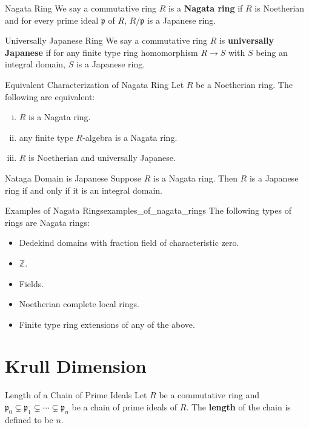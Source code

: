 \begin{definition}{Nagata Ring}{}
    We say a commutative ring $R$ is a \textbf{Nagata ring} if $R$ is Noetherian and for every prime ideal $\mathfrak{p}$ of $R$, $R/\mathfrak{p}$ is a Japanese ring.
\end{definition}

\begin{definition}{Universally Japanese Ring}{}
    We say a commutative ring $R$ is \textbf{universally Japanese} if for any finite type ring homomorphism $R\to S$ with $S$ being an integral domain, $S$ is a Japanese ring.
\end{definition}

\begin{proposition}{Equivalent Characterization of Nagata Ring}{}
    Let $R$ be a Noetherian ring. The following are equivalent:
    \begin{enumerate}[(i)]
        \item $R$ is a Nagata ring.
        \item any finite type $R$-algebra is a Nagata ring.
        \item $R$ is Noetherian and universally Japanese.
    \end{enumerate}
\end{proposition}
\begin{corollary}{Nataga Domain is Japanese}{}
    Suppose $R$ is a Nagata ring. Then $R$ is a Japanese ring if and only if it is an integral domain.
\end{corollary}

\begin{example}{Examples of Nagata Rings}{examples_of_nagata_rings}
    The following types of rings are Nagata rings:
    \begin{itemize}
        \item Dedekind domains with fraction field of characteristic zero.
        \item $\mathbb{Z}$.
        \item Fields.
        \item Noetherian complete local rings.
        \item Finite type ring extensions of any of the above.
    \end{itemize}
\end{example}


\section{Krull Dimension}
\begin{definition}{Length of a Chain of Prime Ideals}{}
    Let $R$ be a commutative ring and $\mathfrak{p}_0\subsetneq\mathfrak{p}_1\subsetneq\cdots\subsetneq\mathfrak{p}_n$ be a chain of prime ideals of $R$. The \textbf{length} of the chain is defined to be $n$.
\end{definition}


